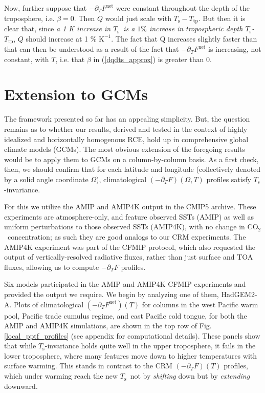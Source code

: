 \documentclass[10pt]{article}
\newcommand{\eqnref}[1]{(\ref{#1})}
\newcommand{\ppt}{\ensuremath{\partial_T}}
\newcommand{\cotwo}{\ensuremath{\mathrm{CO_2}}}
\newcommand{\FLW}{\ensuremath{F^\mathrm{LW}}}
\newcommand{\Fnet}{\ensuremath{F^\mathrm{net}}}
\newcommand{\Ts}{\ensuremath{T_\mathrm{s}}}
\newcommand{\Ttp}{\ensuremath{T_\mathrm{tp}}}
\newcommand{\Kinverse}{\ensuremath{\mathrm{K^{-1}}}}
\begin{document}
Now, further suppose that $-\ppt \Fnet$ were constant throughout the depth of the troposphere, i.e. $\beta=0$. Then $Q$ would just scale with $\Ts-\Ttp$. But then it is clear that, since \emph{a 1 K increase in \Ts\  is a $1\%$ increase in tropospheric depth \Ts-\Ttp}, $Q$ should increase at 1 \% \Kinverse. The fact that Q increases slightly faster than that can then be understood as a result of the fact that $-\ppt \Fnet$ is increasing, not constant, with $T$, i.e. that $\beta$ in \eqnref{dqdts_approx} is greater than 0.


\section{Extension to GCMs} \label{sec_GCMs}
The framework presented so far has an appealing simplicity. But, the question remains as to whether our results, derived and tested in the context of highly idealized and horizontally homogenous RCE, hold up in comprehensive global climate models (GCMs). The most obvious extension of the foregoing results would be to apply them to GCMs on a column-by-column basis. As a first check, then, we should confirm that  for each latitude and longitude (collectively denoted  by a solid angle coordinate $\Omega$),  climatological  $(-\ppt F)(\Omega,T)$ profiles satisfy \Ts-invariance. 

For this we utilize the AMIP and AMIP4K  output in the CMIP5 archive. These experiments are atmosphere-only, and feature observed SSTs (AMIP) as well as uniform perturbations to those observed SSTs (AMIP4K), with no change in \cotwo\ concentration; as such they are good analogs to our CRM experiments. The AMIP4K experiment was part of the CFMIP protocol, which also requested the output of vertically-resolved radiative fluxes, rather than just surface and TOA fluxes, allowing us to compute $-\ppt F$ profiles.

Six models participated in the AMIP and AMIP4K CFMIP experiments and provided the output we require. We begin by analyzing one of them, HadGEM2-A. Plots of climatological $(-\ppt \Fnet)(T)$ for columns in the west Pacific warm pool, Pacific trade cumulus regime, and east Pacific cold tongue,  for both the AMIP and AMIP4K simulations, are shown in the top row of Fig. \ref{local_pptf_profiles} (see appendix for computational details). These panels show that while \Ts-invariance holds quite well in the upper troposphere, it fails in the lower troposphere, where many features move down to higher temperatures with surface warming. This stands in contrast to the CRM $(-\ppt F)(T)$ profiles, which under warming reach the new \Ts\ not by \emph{shifting} down but by \emph{extending} downward.
\end{document}
